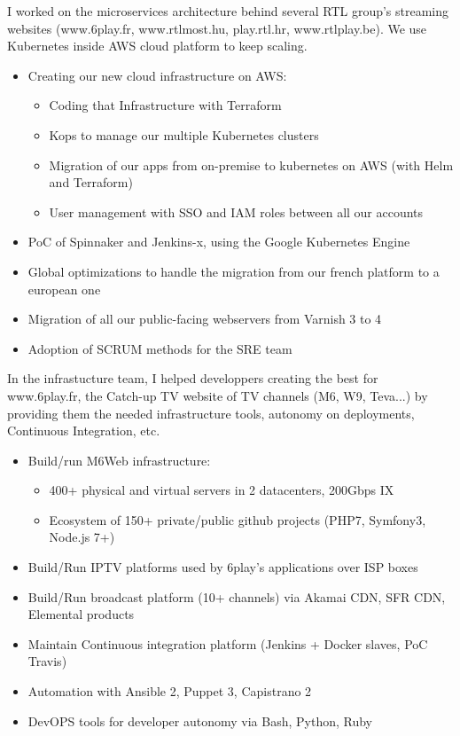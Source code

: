 \documentclass[12pt,a4paper,roman]{moderncv}          %
\begin{document}
{I worked on the microservices architecture behind several RTL group's streaming websites (www.6play.fr, www.rtlmost.hu, play.rtl.hr, www.rtlplay.be). We use Kubernetes inside AWS cloud platform to keep scaling.
\begin{itemize}
  \item Creating our new cloud infrastructure on AWS:
  \begin{itemize}
    \item Coding that Infrastructure with Terraform
    \item Kops to manage our multiple Kubernetes clusters
    \item Migration of our apps from on-premise to kubernetes on AWS (with Helm and Terraform)
    \item User management with SSO and IAM roles between all our accounts
  \end{itemize}
  \item PoC of Spinnaker and Jenkins-x, using the Google Kubernetes Engine
  \item Global optimizations to handle the migration from our french platform to a european one
  \item Migration of all our public-facing webservers from Varnish 3 to 4
  \item Adoption of SCRUM methods for the SRE team
\end{itemize}}


{In the infrastucture team, I helped developpers creating the best for www.6play.fr, the Catch-up TV website of TV channels (M6, W9, Teva...) by providing them the needed infrastructure tools, autonomy on deployments, Continuous Integration, etc.
\begin{itemize}
  \item Build/run M6Web infrastructure:
  \begin{itemize}
    \item 400+ physical and virtual servers in 2 datacenters, 200Gbps IX
    \item Ecosystem of 150+ private/public github projects (PHP7, Symfony3, Node.js 7+)
  \end{itemize}
  \item Build/Run IPTV platforms used by 6play's applications over ISP boxes
  \item Build/Run broadcast platform (10+ channels) via Akamai CDN, SFR CDN, Elemental products
  \item Maintain Continuous integration platform (Jenkins + Docker slaves, PoC Travis)
  \item Automation with Ansible 2, Puppet 3, Capistrano 2
  \item DevOPS tools for developer autonomy via Bash, Python, Ruby
\end{itemize}}
\end{document}
